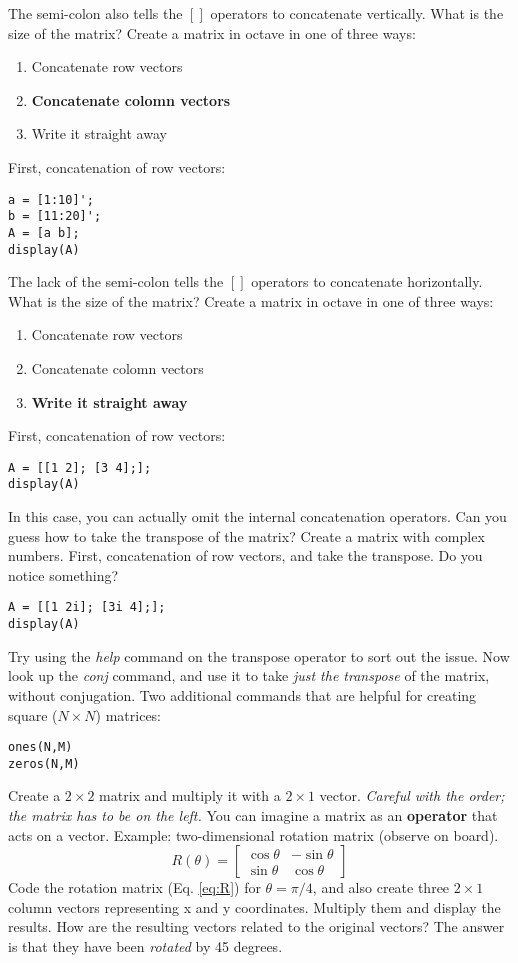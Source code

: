 \documentclass[10pt]{article}
\begin{document}
The semi-colon also tells the $[]$ operators to concatenate vertically.  What is the size of the matrix?  Create a matrix in octave in one of three ways:
\begin{enumerate}
\item Concatenate row vectors
\item \textbf{Concatenate colomn vectors}
\item Write it straight away
\end{enumerate}
First, concatenation of row vectors:
\begin{verbatim}
a = [1:10]';
b = [11:20]';
A = [a b];
display(A)
\end{verbatim}
The lack of the semi-colon tells the $[]$ operators to concatenate horizontally.  What is the size of the matrix?  Create a matrix in octave in one of three ways:
\begin{enumerate}
\item Concatenate row vectors
\item Concatenate colomn vectors
\item \textbf{Write it straight away}
\end{enumerate}
First, concatenation of row vectors:
\begin{verbatim}
A = [[1 2]; [3 4];];
display(A)
\end{verbatim}
In this case, you can actually omit the internal concatenation operators.  Can you guess how to take the transpose of the matrix?  Create a matrix with complex numbers.  First, concatenation of row vectors, and take the transpose.  Do you notice something?
\begin{verbatim}
A = [[1 2i]; [3i 4];];
display(A)
\end{verbatim}
Try using the \textit{help} command on the transpose operator to sort out the issue.  Now look up the \textit{conj} command, and use it to take \textit{just the transpose} of the matrix, without conjugation.  Two additional commands that are helpful for creating square ($N \times N$) matrices:
\begin{verbatim}
ones(N,M)
zeros(N,M)
\end{verbatim}
Create a $2 \times 2$ matrix and multiply it with a $2 \times 1$ vector.  \textit{Careful with the order; the matrix has to be on the left.}  You can imagine a matrix as an \textbf{operator} that acts on a vector.  Example: two-dimensional rotation matrix (observe on board).
\begin{equation}
R(\theta) = \begin{bmatrix} \cos\theta & -\sin\theta \\ \sin\theta & \cos\theta \end{bmatrix} \label{eq:R}
\end{equation}
Code the rotation matrix (Eq. \ref{eq:R}) for $\theta = \pi/4$, and also create three $2 \times 1$ column vectors representing x and y coordinates.  Multiply them and display the results.  How are the resulting vectors related to the original vectors?  The answer is that they have been \textit{rotated} by 45 degrees.
\end{document}
